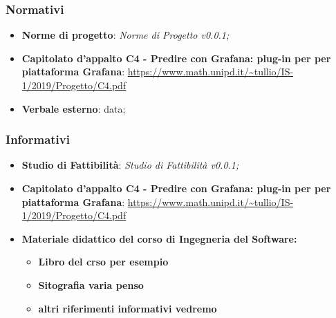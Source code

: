 		\subsubsection{Normativi}
			\begin{itemize}
				\item \textbf{Norme di progetto}: \emph{Norme di Progetto v0.0.1;}
				\item \textbf{Capitolato d'appalto C4 - Predire con Grafana: plug-in per per piattaforma Grafana}: \url{https://www.math.unipd.it/~tullio/IS-1/2019/Progetto/C4.pdf}
				\item \textbf{Verbale esterno}: data; 
			\end{itemize}
		
		\subsubsection{Informativi}
			\begin{itemize}
				\item \textbf{Studio di Fattibilità}: \emph{Studio di Fattibilità v0.0.1;}
				\item \textbf{Capitolato d'appalto C4 - Predire con Grafana: plug-in per per piattaforma Grafana}: \url{https://www.math.unipd.it/~tullio/IS-1/2019/Progetto/C4.pdf}
				\item \textbf{Materiale didattico del corso di Ingegneria del Software:}
				\begin{itemize}
					\item \textbf{Libro del crso per esempio}
					\item \textbf{Sitografia varia penso}
					\item \textbf{altri riferimenti informativi vedremo}
				\end{itemize}
			\end{itemize}				
	